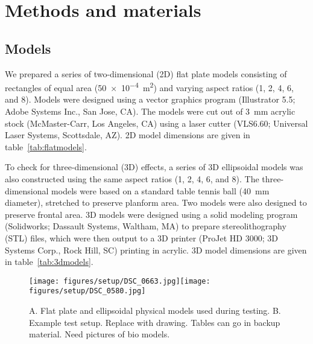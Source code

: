 \documentclass{jfm}
\begin{document}
\section{Methods and materials}

\subsection{Models}

We prepared a series of two-dimensional (2D) flat plate models consisting of rectangles of equal area (\SI{50e-4}{\meter\squared}) and varying aspect ratios (1, 2, 4, 6, and 8). Models were designed using a vector graphics program (Illustrator 5.5; Adobe Systems Inc., San Jose, CA). The models were cut out of \SI{3}{\milli\meter} acrylic stock (McMaster-Carr, Los Angeles, CA) using a laser cutter (VLS6.60; Universal Laser Systems, Scottsdale, AZ).  2D model dimensions are given in table~\ref{tab:flatmodels}. 


To check for three-dimensional (3D) effects, a series of 3D ellipsoidal models was also constructed using the same aspect ratios (1, 2, 4, 6, and 8).  The three-dimensional models were based on a standard table tennis ball (\SI{40}{\milli\meter} diameter), stretched to preserve planform area.  Two models were also designed to preserve frontal area.  3D models were designed using a solid modeling program (Solidworks; Dassault Systems, Waltham, MA) to prepare stereolithography (STL) files, which were then output to a 3D printer (ProJet HD 3000; 3D Systems Corp., Rock Hill, SC) printing in acrylic. 3D model dimensions are given in table~\ref{tab:3dmodels}.

\begin{figure}
\centerline{\texttt{[image: figures/setup/DSC\_0663.jpg]}\texttt{[image: figures/setup/DSC\_0580.jpg]}}
\caption{A. Flat plate and ellipsoidal physical models used during testing. B. Example test setup.  Replace with drawing. Tables can go in backup material.  Need pictures of bio models.}
\end{figure}
\end{document}
